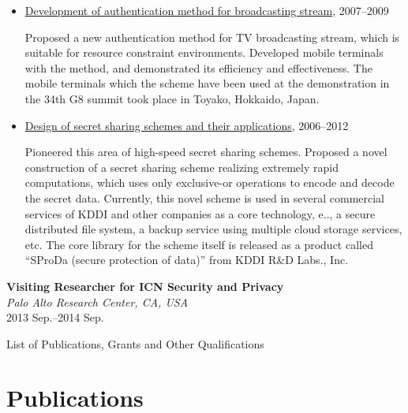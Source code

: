 \begin{itemize}
\item \hspace*{4ex}
\underline{Development of authentication method for broadcasting stream},
2007--2009\\[0.5ex]
\hspace*{6ex}
\begin{minipage}{0.9\linewidth}
Proposed a new authentication method for TV broadcasting stream, which is suitable for
resource constraint environments. Developed mobile terminals with the
 method, and demonstrated its efficiency and effectiveness.
The mobile terminals which the scheme have been used at the
 demonstration in the 34th G8 summit took place in Toyako, Hokkaido, Japan.
\end{minipage}

\item \hspace*{4ex}
\underline{Design of secret sharing schemes and their applications},
2006--2012\\[0.5ex]
\hspace*{6ex}
\begin{minipage}{0.9\linewidth}
Pioneered this area of high-speed secret sharing schemes. Proposed a
 novel construction of a secret sharing scheme realizing extremely rapid
 computations, which uses only exclusive-or operations to encode and
 decode the secret data.
Currently, this novel scheme is used in several commercial services of
 KDDI and other companies as a core technology,
 e.\@g.\@, a secure distributed file system, a backup
 service using multiple cloud storage services, etc.
The core library for the scheme itself is released as a product called ``SProDa (secure protection of data)'' from KDDI R\&D Labs., Inc.
\end{minipage}
\end{itemize}

\textbf{Visiting Researcher for ICN Security and Privacy}\\
\hspace*{4ex}\textit{Palo Alto Research Center, CA, USA}\\
\hspace*{4ex} 2013 Sep.--2014 Sep.



\newpage
\begin{center}
\Large
List of Publications, Grants and Other Qualifications
\end{center}

\section*{Publications}

